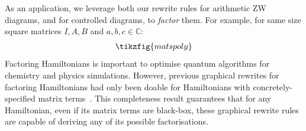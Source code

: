 As an application, we leverage both our rewrite rules for arithmetic ZW diagrams, and for controlled diagrams, to \emph{factor} them.  For example, for same size square matrices $I, A, B$ and $a, b, c \in \mathbb{C}$:
\begin{gather}
    \tikzfig{matspoly}
\end{gather}
Factoring Hamiltonians is important to optimise quantum algorithms for chemistry and physics simulations. However, previous graphical rewrites for factoring Hamiltonians had only been doable for Hamiltonians with concretely-specified matrix terms~\cite{shaikh2022sum}. This completeness result guarantees that for any Hamiltonian, even if its matrix terms are black-box, these graphical rewrite rules are capable of deriving any of its possible factorisations.